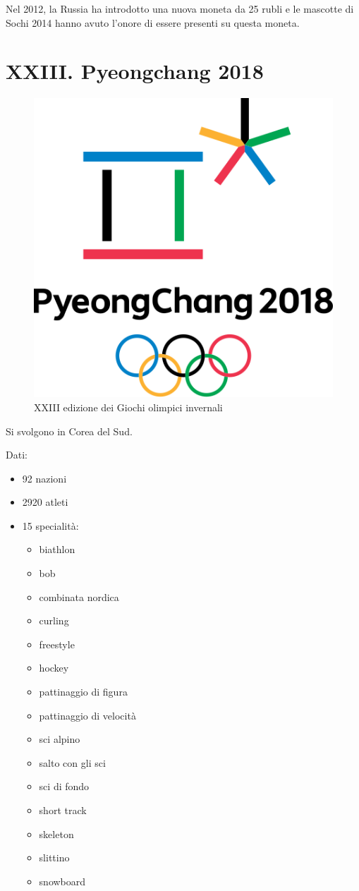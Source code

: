 \documentclass[
]{book}
\providecommand{\tightlist}{%
  \setlength{\itemsep}{0pt}\setlength{\parskip}{0pt}}
\begin{document}
Nel 2012, la Russia ha introdotto una nuova moneta da 25 rubli e le mascotte di Sochi 2014 hanno avuto l'onore di essere presenti su questa moneta.

\chapter*{XXIII. Pyeongchang 2018}\label{xxiii.-pyeongchang-2018}

\begin{figure}
\includegraphics[width=0.4\linewidth]{images/loghi/2018} \caption{XXIII edizione dei Giochi olimpici invernali}\label{fig:unnamed-chunk-90}
\end{figure}

Si svolgono in Corea del Sud.

Dati:

\begin{itemize}
\tightlist
\item
  92 nazioni
\item
  2920 atleti
\item
  15 specialità:

  \begin{itemize}
  \tightlist
  \item
    biathlon
  \item
    bob
  \item
    combinata nordica
  \item
    curling
  \item
    freestyle
  \item
    hockey
  \item
    pattinaggio di figura
  \item
    pattinaggio di velocità
  \item
    sci alpino
  \item
    salto con gli sci
  \item
    sci di fondo
  \item
    short track
  \item
    skeleton
  \item
    slittino
  \item
    snowboard
  \end{itemize}
\end{itemize}
\end{document}
